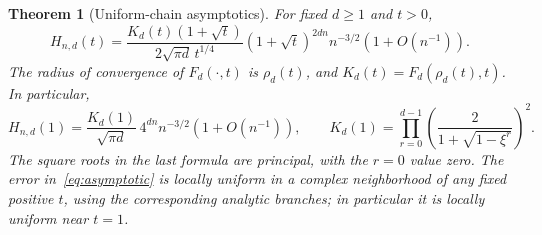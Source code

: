 \documentclass[11pt]{article}
\numberwithin{equation}{section}
\newtheorem{theorem}{Theorem}[section]
\theoremstyle{definition}
\begin{document}
\begin{theorem}[Uniform-chain asymptotics]
\label{thm:asymptotics}
For fixed $d\geq1$ and $t>0$,
\begin{equation}
 \boxed{H_{n,d}(t)=
 \frac{K_d(t)(1+\sqrt t)}{2\sqrt{\pi d}\,t^{1/4}}
 (1+\sqrt t)^{2dn}n^{-3/2}\left(1+O(n^{-1})\right).}
 \label{eq:asymptotic}
\end{equation}
The radius of convergence of $F_d(\cdot,t)$ is $\rho_d(t)$, and
$K_d(t)=F_d(\rho_d(t),t)$. In particular,
\begin{equation}
 H_{n,d}(1)=\frac{K_d(1)}{\sqrt{\pi d}}\,
                4^{dn}n^{-3/2}\left(1+O(n^{-1})\right),
 \qquad
 K_d(1)=\prod_{r=0}^{d-1}
                 \left(\frac{2}{1+\sqrt{1-\xi^r}}\right)^2.
 \label{eq:totalasymptotic}
\end{equation}
The square roots in the last formula are principal, with the $r=0$ value
zero. The error in~\eqref{eq:asymptotic} is locally uniform in a complex
neighborhood of any fixed positive $t$, using the corresponding analytic
branches; in particular it is locally uniform near $t=1$.
\end{theorem}
\end{document}
